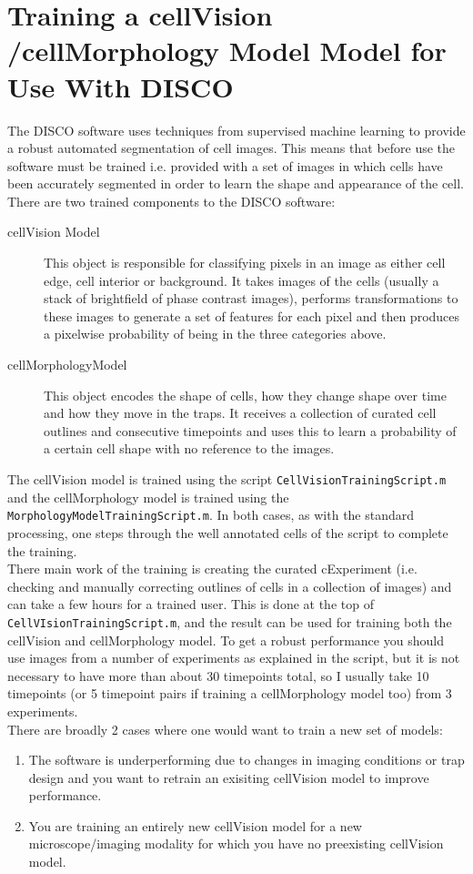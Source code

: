 \section{Training a cellVision /cellMorphology Model Model for Use With DISCO}
\label{sec:training}

The DISCO software uses techniques from supervised machine learning to provide a robust automated segmentation of cell images. This means that before use the software must be trained i.e. provided with a set of images in which cells have been accurately segmented in order to learn the shape and appearance of the cell. \\

There are two trained components to the DISCO software:
\begin{description}
	\item[cellVision Model] This object is responsible for classifying pixels in an image as either cell edge, cell interior or background. It takes images of the cells (usually a stack of brightfield of phase contrast images), performs transformations to these images to generate a set of features for each pixel and then produces a pixelwise probability of being in the three categories above.
	\item[cellMorphologyModel] This object encodes the shape of cells, how they change shape over time and how they move in the traps. It receives a collection of curated cell outlines and consecutive timepoints and uses this to learn a probability of a certain cell shape with no reference to the images.
\end{description}


The cellVision model is trained using the script \texttt{CellVisionTrainingScript.m} and the cellMorphology model is trained using the \texttt{MorphologyModelTrainingScript.m}. In both cases, as with the standard processing, one steps through the well annotated cells of the script to complete the training. \\
There main work of the training is creating the curated cExperiment (i.e. checking and manually correcting outlines of cells in a collection of images) and can take a few hours for a trained user. This is done at the top of \texttt{CellVIsionTrainingScript.m}, and the result can be used for training both the cellVision and cellMorphology model. To get a robust performance you should use images from a number of experiments as explained in the script, but it is not necessary to have more than about 30 timepoints total, so I usually take 10 timepoints (or 5 timepoint pairs if training a cellMorphology model too) from 3 experiments.\\  
There are broadly 2 cases where one would want to train a new set of models:
\begin{enumerate}
	\item The software is underperforming due to changes in imaging conditions or trap design and you want to retrain an exisiting cellVision model to improve performance.
	\item You are training an entirely new cellVision model for a new microscope/imaging modality for which you have no preexisting cellVision model.
\end{enumerate}

